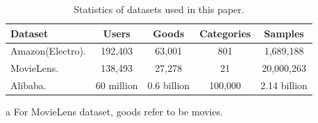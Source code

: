     
\begin{table}[]
\caption{Statistics of datasets used in this paper.}
\small
\centering
\begin{threeparttable}
\begin{tabular}{lcccc}
\toprule
    Dataset       & Users & Goods\tnote{a} & Categories & Samples \\ \midrule
Amazon(Electro). & 192,403 & 63,001 & 801 & 1,689,188 \\ 
MovieLens. & 138,493 & 27,278 & 21 & 20,000,263 \\
Alibaba.  & 60 million & 0.6 billion & 100,000 & 2.14 billion \\ 
\bottomrule
\end{tabular}
\begin{tablenotes}%
        \item[a] For MovieLens dataset, goods refer to be movies.
      \end{tablenotes}
      \end{threeparttable}
\label{table:Statistics}
\end{table}    




